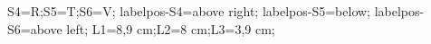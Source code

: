 \documentclass[exercice]{thedocument}%
\begin{document}
%
\>S4=R;\>S5=T;\>S6=V;%
\>labelpos-S4=above right;%
\>labelpos-S5=below;%
\>labelpos-S6=above left;%
\>L1=8,9 cm;\>L2=8 cm;\>L3=3,9 cm;%
%
\end{document}
